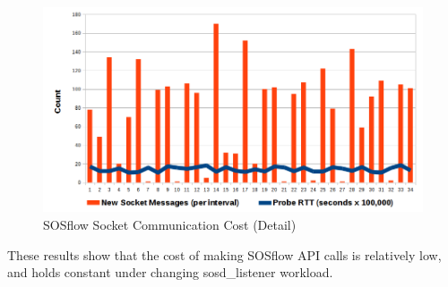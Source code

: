 \begin{figure}[h]
\centering
\includegraphics[width=\columnwidth]{images/icebox_api_cost_zoom.png}
\caption{SOSflow Socket Communication Cost (Detail)}
\label{sock_cost_detail}
\end{figure}
%
\par
%
These results show that the cost of making SOSflow API calls is
relatively low, and holds constant under changing sosd\_listener
workload.
%
%





